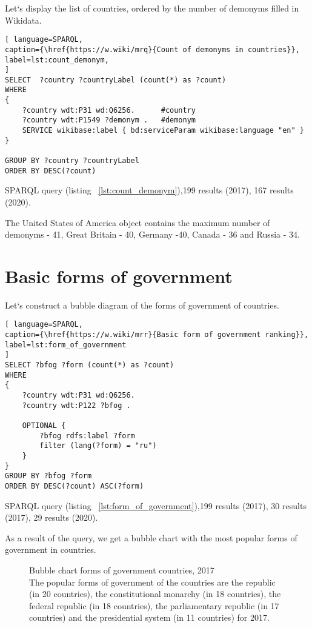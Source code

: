 Let`s display the list of countries, ordered by the number of demonyms filled in Wikidata.

\begin{lstlisting}[ language=SPARQL, 
caption={\href{https://w.wiki/mrq}{Count of demonyms in countries}},
label=lst:count_demonym, 
]
SELECT  ?country ?countryLabel (count(*) as ?count)
WHERE
{
	?country wdt:P31 wd:Q6256.      #country
	?country wdt:P1549 ?demonym .   #demonym
	SERVICE wikibase:label { bd:serviceParam wikibase:language "en" }
}

GROUP BY ?country ?countryLabel 
ORDER BY DESC(?count)
\end{lstlisting}

SPARQL query (listing ~\ref{lst:count_demonym}),199 results (2017), 167 results (2020).

The United States of America object contains the maximum number of demonyms - 41, Great Britain - 40, Germany -40, Canada - 36 and Russia - 34.

\section{Basic forms of government}

Let`s construct a bubble diagram of the forms of government of countries.

\begin{lstlisting}[ language=SPARQL, 
caption={\href{https://w.wiki/mrr}{Basic form of government ranking}},
label=lst:form_of_government
]
SELECT ?bfog ?form (count(*) as ?count)
WHERE 
{
	?country wdt:P31 wd:Q6256.
	?country wdt:P122 ?bfog .
	
	OPTIONAL {
		?bfog rdfs:label ?form
		filter (lang(?form) = "ru")
	}
}
GROUP BY ?bfog ?form
ORDER BY DESC(?count) ASC(?form)
\end{lstlisting}

SPARQL query (listing ~\ref{lst:form_of_government}),199 results (2017), 30 results (2017), 29 results (2020).

As a result of the query, we get a bubble chart with the most popular forms of government in countries.

\begin{figure}
	{
		\setlength{\fboxsep}{0pt}%
		\setlength{\fboxrule}{1pt}%
	}
	\caption{Bubble chart forms of government countries, 2017
	\\ The popular forms of government of the countries are the republic (in 20 countries), the constitutional monarchy (in 18 countries), the federal republic (in 18 countries), the parliamentary republic (in 17 countries) and the presidential system (in 11 countries) for 2017.
}%
	\label{fig:bubble_chart_forms_of_government_countries_2017}%
\end{figure}

